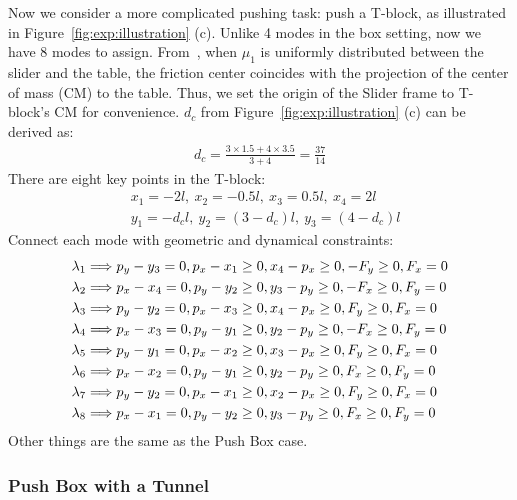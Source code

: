 Now we consider a more complicated pushing task: push a T-block, as illustrated in Figure~\ref{fig:exp:illustration} (c). Unlike 4 modes in the box setting, now we have 8 modes to assign. From~\cite{lynch1992iros-manipulation-active-sensing-pushing}, when $\mu_1$ is uniformly distributed between the slider and the table, the friction center coincides with the projection of the center of mass (CM) to the table. Thus, we set the origin of the Slider frame to T-block's CM for convenience. $d_c$ from Figure~\ref{fig:exp:illustration} (c) can be derived as:
\begin{align}
    d_c = \frac{
        3 \times 1.5 + 4 \times 3.5
    }{3 + 4} = \frac{37}{14}
\end{align}
There are eight key points in the T-block:
\begin{align}
    & x_1 = -2l, \ x_2 = -0.5l, \ x_3 = 0.5l, \ x_4 = 2l \\
    & y_1 = -d_c l, \ y_2 = (3 - d_c) l, \ y_3 = (4 - d_c) l 
\end{align}
Connect each mode with geometric and dynamical constraints:
\begin{align}
    & \lam{1} \Longrightarrow \py - y_3 = 0, \px - x_1 \ge 0, x_4 - \px \ge 0, -\Fy \ge 0, \Fx = 0 \\
    & \lam{2} \Longrightarrow \px - x_4 = 0, \py - y_2 \ge 0, y_3 - \py \ge 0, -\Fx \ge 0, \Fy = 0 \\
    & \lam{3} \Longrightarrow \py - y_2 = 0, \px - x_3 \ge 0, x_4 - \px \ge 0, \Fy \ge 0, \Fx = 0 \\
    & \lam{4} \Longrightarrow \px - x_3 = 0, \py - y_1 \ge 0, y_2 - \py \ge 0, -\Fx \ge 0, \Fy = 0 \\
    & \lam{5} \Longrightarrow \py - y_1 = 0, \px - x_2 \ge 0, x_3 - \px \ge 0, \Fy \ge 0, \Fx = 0 \\
    & \lam{6} \Longrightarrow \px - x_2 = 0, \py - y_1 \ge 0, y_2 - \py \ge 0, \Fx \ge 0, \Fy = 0 \\
    & \lam{7} \Longrightarrow \py - y_2 = 0, \px - x_1 \ge 0, x_2 - \px \ge 0, \Fy \ge 0, \Fx = 0 \\
    & \lam{8} \Longrightarrow \px - x_1 = 0, \py - y_2 \ge 0, y_3 - \py \ge 0, \Fx \ge 0, \Fy = 0
\end{align}
Other things are the same as the Push Box case. 

% 

\subsubsection{Push Box with a Tunnel}
\label{app:pd:push-box-tunnel}

